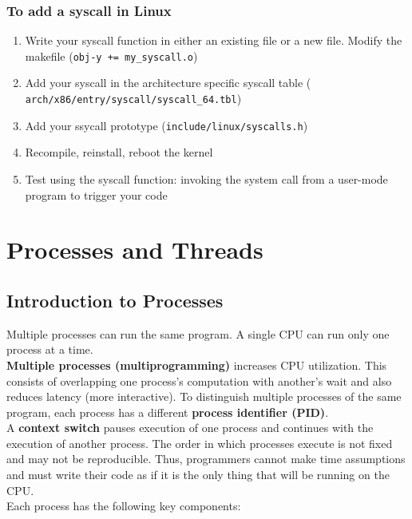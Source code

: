 \documentclass{article}
\begin{document}
    \subsubsection{To add a syscall in Linux}

    \begin{enumerate}
    \item Write your syscall function in either an existing file or a new file. Modify the makefile (\texttt{obj-y += my\_syscall.o})
    \item Add your syscall in the architecture specific syscall table (
    \texttt{arch/x86/entry/syscall/syscall\_64.tbl})
    \item Add your ssycall prototype (\texttt{include/linux/syscalls.h})
    \item Recompile, reinstall, reboot the kernel
    \item Test using the syscall function: invoking the system call from a user-mode program to trigger your code
    \end{enumerate}

\newpage
\section{Processes and Threads}

\subsection{Introduction to Processes}

    Multiple processes can run the same program. A single CPU can run only one process at a time. \\

    \textbf{Multiple processes (multiprogramming)} increases CPU utilization. This consists of overlapping one process's computation with another's wait and also reduces latency (more interactive). To distinguish multiple processes of the same program, each process has a different \textbf{process identifier (PID)}. \\

    A \textbf{context switch} pauses execution of one process and continues with the execution of another process. The order in which processes execute is not fixed and may not be reproducible. Thus, programmers cannot make time assumptions and must write their code as if it is the only thing that will be running on the CPU. \\

    \noindent Each process has the following key components: 
\end{document}
